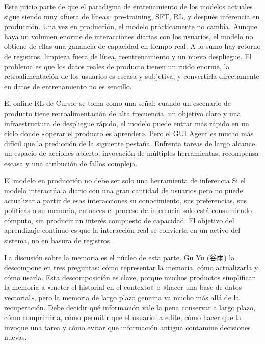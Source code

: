 \documentclass[a4paper]{article}
\begin{document}
Este juicio parte de que el paradigma de entrenamiento de los modelos actuales sigue siendo muy «fuera de línea»: pre-training, SFT, RL, y después inferencia en producción. Una vez en producción, el modelo prácticamente no cambia. Aunque haya un volumen enorme de interacciones diarias con los usuarios, el modelo no obtiene de ellas una ganancia de capacidad en tiempo real. A lo sumo hay retorno de registros, limpieza fuera de línea, reentrenamiento y un nuevo despliegue. El problema es que los datos reales de producto tienen un ruido enorme, la retroalimentación de los usuarios es escasa y subjetiva, y convertirla directamente en datos de entrenamiento no es sencillo.

El online RL de Cursor se toma como una señal: cuando un escenario de producto tiene retroalimentación de alta frecuencia, un objetivo claro y una infraestructura de despliegue rápido, el modelo puede entrar más rápido en un ciclo donde «operar el producto es aprender». Pero el GUI Agent es mucho más difícil que la predicción de la siguiente pestaña. Enfrenta tareas de largo alcance, un espacio de acciones abierto, invocación de múltiples herramientas, recompensa escasa y una atribución de fallos compleja.

\begin{importantbox}{El modelo en producción no debe ser solo una herramienta de inferencia}
Si el modelo interactúa a diario con una gran cantidad de usuarios pero no puede actualizar a partir de esas interacciones su conocimiento, sus preferencias, sus políticas o su memoria, entonces el proceso de inferencia solo está consumiendo cómputo, sin producir un interés compuesto de capacidad. El objetivo del aprendizaje continuo es que la interacción real se convierta en un activo del sistema, no en basura de registros.
\end{importantbox}

La discusión sobre la memoria es el núcleo de esta parte. Gu Yu (谷雨) la descompone en tres preguntas: cómo representar la memoria, cómo actualizarla y cómo usarla. Esta descomposición es clave, porque muchos productos simplifican la memoria a «meter el historial en el contexto» o «hacer una base de datos vectorial», pero la memoria de largo plazo genuina va mucho más allá de la recuperación. Debe decidir qué información vale la pena conservar a largo plazo, cómo comprimirla, cómo permitir que el usuario la edite, cómo hacer que la invoque una tarea y cómo evitar que información antigua contamine decisiones nuevas.
\end{document}
